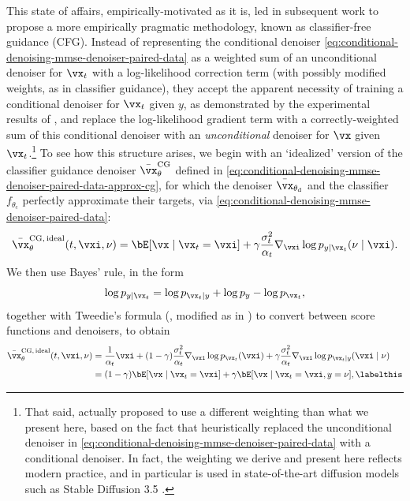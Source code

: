 \documentclass[../../book-main.tex]{subfiles}
\begin{document}
This state of affairs, empirically-motivated as it is, led \citet{Ho2022-ry} in
subsequent work to propose a more empirically pragmatic methodology, known as
classifier-free guidance (CFG). Instead of representing the conditional denoiser
\eqref{eq:conditional-denoising-mmse-denoiser-paired-data} as a weighted sum
of an unconditional denoiser for $\vx_t$ with a log-likelihood correction term
(with possibly modified weights, as in classifier guidance), they accept the
apparent necessity of training a conditional denoiser for $\vx_t$ given $y$, as
demonstrated by the experimental results of \citet{Dhariwal2021-hg}, and replace 
the log-likelihood gradient term with a correctly-weighted sum of this
conditional denoiser with an \textit{unconditional} denoiser for $\vx$ given
$\vx_t$.\footnote{That said, \textcite{Ho2022-ry} actually proposed to use
a different weighting than what we present here, based on the fact that
\textcite{Dhariwal2021-hg} heuristically replaced the unconditional denoiser in
\eqref{eq:conditional-denoising-mmse-denoiser-paired-data} with
a conditional denoiser. In fact, the weighting we derive and present here
reflects modern practice, and in particular is used in state-of-the-art
diffusion models such as Stable Diffusion 3.5
\cite{DBLP:conf/icml/EsserKBEMSLLSBP24}.} To see how this structure arises, we
begin with an `idealized' version of the classifier guidance denoiser
$\bar{\vx}_{\theta}^{\mathrm{CG}}$ defined in
\eqref{eq:conditional-denoising-mmse-denoiser-paired-data-approx-cg},
for which the denoiser $\bar{\vx}_{\theta_{\mathrm{d}}}$ and the classifier
$f_{\theta_{\mathrm{c}}}$ perfectly approximate their targets, via
\eqref{eq:conditional-denoising-mmse-denoiser-paired-data}:
\begin{equation}\label{eq:conditional-denoising-mmse-denoiser-paired-data-exact-cg}
  \bar{\vx}_{\theta}^{\mathrm{CG,\,ideal}}(t, \vxi, \nu)
  =
  \bE[\vx \mid \vx_t=\vxi]
  + \gamma\frac{\sigma_t^2}{\alpha_t}
  \nabla_{\vxi}\log p_{y \mid \vx_t}(\nu\mid \vxi).
\end{equation}
We then use Bayes' rule, in the form
\begin{equation}
  \log p_{y \mid \vx_t}
  =
  \log p_{\vx_t \mid y} + \log p_{y} - \log p_{\vx_t},
\end{equation}
together with Tweedie's formula (, modified as in
) to convert between score functions and denoisers,
to obtain
\begin{align*}
  \bar{\vx}_{\theta}^{\mathrm{CG,\,ideal}}(t, \vxi, \nu)
  &=
  \frac{1}{\alpha_t} \vxi 
  + (1-\gamma) \frac{\sigma_t^2}{\alpha_t} 
  \nabla_{\vxi}\log p_{\vx_t}(\vxi)
  + \gamma \frac{\sigma_t^2}{\alpha_t} 
  \nabla_{\vxi}\log p_{\vx_t \mid y}(\vxi \mid \nu)
  \\
  &=
  (1 - \gamma) \bE[\vx \mid \vx_t=\vxi]
  +
  \gamma \bE[\vx \mid \vx_t=\vxi, y=\nu],
  \labelthis\label{eq:ideal-cfg-denoiser}
\end{align*}
\end{document}
